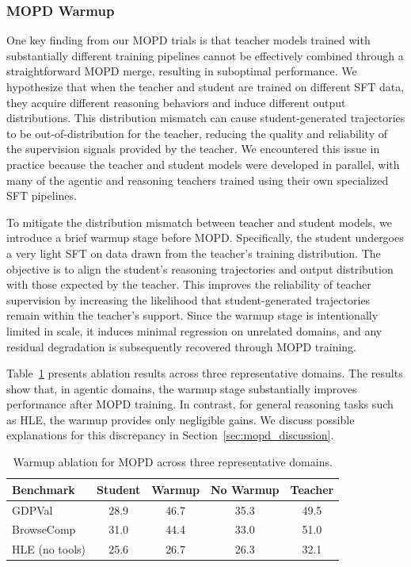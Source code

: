 \subsubsection{MOPD Warmup}

One key finding from our MOPD trials is that teacher models trained with substantially different training pipelines cannot be effectively combined through a straightforward MOPD merge, resulting in suboptimal performance. We hypothesize that when the teacher and student are trained on different SFT data, they acquire different reasoning behaviors and induce different output distributions. This distribution mismatch can cause student-generated trajectories to be out-of-distribution for the teacher, reducing the quality and reliability of the supervision signals provided by the teacher. We encountered this issue in practice because the teacher and student models were developed in parallel, with many of the agentic and reasoning teachers trained using their own specialized SFT pipelines.

To mitigate the distribution mismatch between teacher and student models, we introduce a brief warmup stage before MOPD. Specifically, the student undergoes a very light SFT on data drawn from the teacher's training distribution. The objective is to align the student's reasoning trajectories and output distribution with those expected by the teacher. This improves the reliability of teacher supervision by increasing the likelihood that student-generated trajectories remain within the teacher's support. Since the warmup stage is intentionally limited in scale, it induces minimal regression on unrelated domains, and any residual degradation is subsequently recovered through MOPD training.

Table~\ref{tab:mopd_warmup} presents ablation results across three representative domains. The results show that, in agentic domains, the warmup stage substantially improves performance after MOPD training. In contrast, for general reasoning tasks such as HLE, the warmup provides only negligible gains. We discuss possible explanations for this discrepancy in Section~\ref{sec:mopd_discussion}.



\begin{table}[!htp]
\centering
\small
\begin{tabular}{l|cccc}
\toprule
Benchmark & Student & Warmup & No Warmup & Teacher\\
\midrule
GDPVal         & 28.9 & 46.7 & 35.3 & 49.5 \\
BrowseComp     & 31.0 & 44.4 & 33.0 & 51.0\\
HLE (no tools) & 25.6 & 26.7 & 26.3 & 32.1\\
\bottomrule
\end{tabular}
\caption{Warmup ablation for MOPD across three representative domains.}
\label{tab:mopd_warmup}
\end{table}

